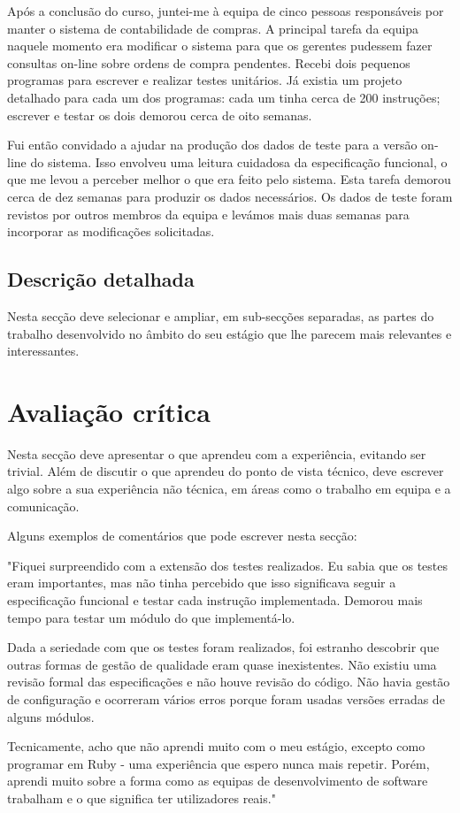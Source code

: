 \documentclass{article}
\begin{document}
Após a conclusão do curso, juntei-me à equipa de cinco pessoas responsáveis por manter o sistema de contabilidade de compras. A principal tarefa da equipa naquele momento era modificar o sistema para que os gerentes pudessem fazer consultas on-line sobre ordens de compra pendentes. Recebi dois pequenos programas para escrever e realizar testes unitários. Já existia um projeto detalhado para cada um dos programas: cada um tinha cerca de 200 instruções; escrever e testar os dois demorou cerca de oito semanas.

Fui então convidado a ajudar na produção dos dados de teste para a versão on-line do sistema. Isso envolveu uma leitura cuidadosa da especificação funcional, o que me levou a perceber melhor o que era feito pelo sistema. Esta tarefa demorou cerca de dez semanas para produzir os dados necessários. Os dados de teste foram revistos por outros membros da equipa e levámos mais duas semanas para incorporar as modificações solicitadas.

\subsection{Descrição detalhada}
Nesta secção deve  selecionar e ampliar, em sub-secções separadas, as partes do trabalho desenvolvido no âmbito do seu estágio que lhe parecem mais relevantes e interessantes.

\cleardoublepage
\section{Avaliação crítica}
\label{sec:ava-crt}
Nesta secção deve apresentar o que aprendeu com a experiência, evitando ser trivial. Além de discutir o que aprendeu do ponto de vista técnico, deve escrever algo sobre a sua experiência não técnica, em áreas como o trabalho em equipa e a comunicação.

Alguns exemplos de comentários que pode escrever nesta secção:

"Fiquei surpreendido com a extensão dos testes realizados. Eu sabia que os testes eram importantes, mas não tinha percebido que isso significava seguir a especificação funcional e testar cada instrução implementada. Demorou mais tempo para testar um módulo do que  implementá-lo.

Dada a seriedade com que os testes foram realizados, foi estranho descobrir que outras formas de gestão de qualidade eram quase inexistentes. Não existiu uma revisão formal das especificações e não houve revisão do código. Não havia gestão de configuração e ocorreram vários erros porque foram usadas versões erradas de alguns módulos.

Tecnicamente, acho que não aprendi muito com o meu estágio, excepto como programar em Ruby - uma experiência que espero nunca mais repetir. Porém, aprendi muito sobre a forma como as equipas de desenvolvimento de software trabalham e o que significa ter utilizadores reais."


\cleardoublepage


\label{referencias}
\end{document}

